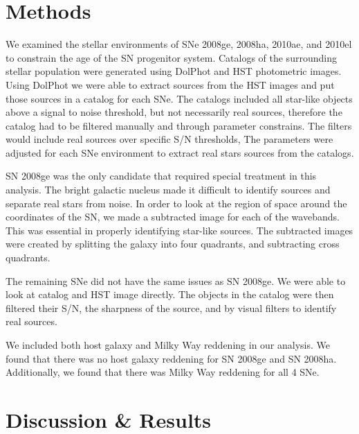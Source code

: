 \documentclass[preprint]{aastex}
\begin{document}
\section{Methods}
We examined the stellar environments of SNe 
 2008ge, 2008ha, 2010ae, and 2010el 
to constrain the age of the SN progenitor system.
Catalogs of the surrounding stellar population 
were generated using DolPhot and HST photometric images. 
Using DolPhot we were able to extract sources from the HST images 
and put those sources in a catalog for each SNe. 
The catalogs included all star-like objects above
a signal to noise threshold, but not necessarily real sources, therefore the catalog had to be
filtered manually and through parameter constrains. 
The filters would include real sources over specific S/N thresholds, 
The parameters were adjusted for each SNe environment to extract real stars sources from the catalogs.

SN 2008ge was the only candidate that required special treatment in this analysis. 
The bright galactic nucleus made it difficult to identify sources and separate real stars from noise. 
In order to look at the region of space around the coordinates of the SN,
we made a subtracted image for each of the wavebands. This was essential in
properly identifying star-like sources. 
The subtracted images were created by splitting the galaxy into four quadrants, and subtracting 
cross quadrants. 

The remaining SNe did not have the same issues as SN 2008ge. We were able to look at catalog
 and HST image directly. The objects in the catalog were then filtered their 
S/N, the sharpness of the source, and by visual filters to identify real sources.

We included both host galaxy and Milky Way reddening in our analysis. 
 We found that there was no host galaxy reddening for SN 2008ge and SN 2008ha.
 Additionally, we found that there was Milky Way reddening for all 4 SNe.

\section{Discussion \& Results}
\end{document}
